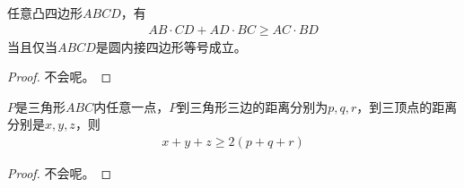 \begin{theorem}
  任意凸四边形$ABCD$，有
  \begin{align}
    AB\cdot CD + AD\cdot BC\ge AC\cdot BD
  \end{align}
  当且仅当$ABCD$是圆内接四边形等号成立。
\end{theorem}
\begin{proof}
  \color{red}不会呢。
\end{proof}

\begin{theorem}
  $P$是三角形$ABC$内任意一点，$P$到三角形三边的距离分别为$p,q,r$，到三顶点的距离分别是$x,y,z$，则
  \begin{align}
    x+y+z\ge 2(p+q+r)
  \end{align}
\end{theorem}
\begin{proof}
  \color{red}不会呢。
\end{proof}
